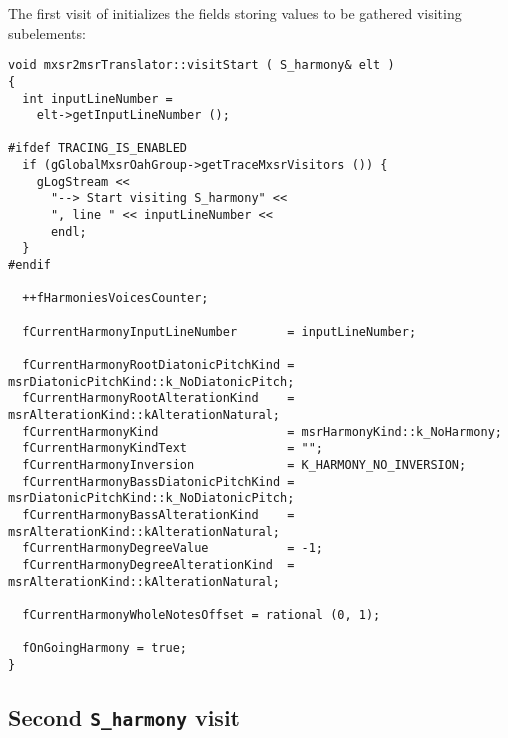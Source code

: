 The first visit of  initializes the fields storing values to be gathered visiting subelements:
\begin{lstlisting}[language=CPlusPlus]
void mxsr2msrTranslator::visitStart ( S_harmony& elt )
{
  int inputLineNumber =
    elt->getInputLineNumber ();

#ifdef TRACING_IS_ENABLED
  if (gGlobalMxsrOahGroup->getTraceMxsrVisitors ()) {
    gLogStream <<
      "--> Start visiting S_harmony" <<
      ", line " << inputLineNumber <<
      endl;
  }
#endif

  ++fHarmoniesVoicesCounter;

  fCurrentHarmonyInputLineNumber       = inputLineNumber;

  fCurrentHarmonyRootDiatonicPitchKind = msrDiatonicPitchKind::k_NoDiatonicPitch;
  fCurrentHarmonyRootAlterationKind    = msrAlterationKind::kAlterationNatural;
  fCurrentHarmonyKind                  = msrHarmonyKind::k_NoHarmony;
  fCurrentHarmonyKindText              = "";
  fCurrentHarmonyInversion             = K_HARMONY_NO_INVERSION;
  fCurrentHarmonyBassDiatonicPitchKind = msrDiatonicPitchKind::k_NoDiatonicPitch;
  fCurrentHarmonyBassAlterationKind    = msrAlterationKind::kAlterationNatural;
  fCurrentHarmonyDegreeValue           = -1;
  fCurrentHarmonyDegreeAlterationKind  = msrAlterationKind::kAlterationNatural;

  fCurrentHarmonyWholeNotesOffset = rational (0, 1);

  fOnGoingHarmony = true;
}
\end{lstlisting}


\subsection{Second {\tt S_harmony} visit}

